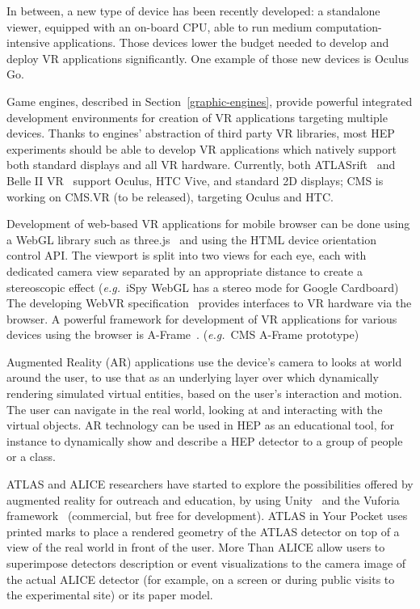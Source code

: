 \documentclass[12pt,a4paper]{article}
\begin{document}
In between, a new type of device has been recently developed: a standalone viewer, equipped with an on-board CPU, able to run medium computation-intensive applications. Those devices lower the budget needed to develop and deploy VR applications significantly. One example of those new devices is Oculus Go\cite{OculusGo}. 

Game engines, described in Section~\ref{graphic-engines},  provide powerful integrated development environments for creation of VR applications targeting multiple devices. Thanks to engines' abstraction of third party VR libraries, most HEP experiments should be able to develop VR applications which natively support both standard displays and all VR hardware. Currently, both ATLASrift~\cite{ATLASRift} and Belle II VR~\cite{BelleIIVR} support Oculus, HTC Vive,
and standard 2D displays; CMS is working on CMS.VR (to be released), targeting Oculus and HTC. 

Development of web-based VR applications for mobile browser can be done using a WebGL library such as three.js~\cite{ThreeJS} and using the
HTML device orientation control API. The viewport is split into two views for each eye, each with dedicated camera view separated
by an appropriate distance to create a stereoscopic effect ({\it e.g.}\ iSpy WebGL has a stereo mode for Google Cardboard)
The developing WebVR specification~\cite{WebVR} provides interfaces to VR hardware via the browser. A powerful framework for
development of VR applications for various devices using the browser is A-Frame~\cite{AFrame}. ({\it e.g.}\ CMS A-Frame prototype)


Augmented Reality (AR) applications use the device's camera to looks at world around the user, to use that as an underlying layer over which dynamically rendering simulated virtual entities, based on the user's interaction and motion. The user can navigate in the real world, looking at and interacting with the virtual objects. AR technology can be used in HEP as an educational tool, for instance to dynamically show and describe a HEP detector to a group of people or a class. 

ATLAS and ALICE researchers have started to explore the possibilities offered by augmented reality for outreach and education, by using Unity~\cite{Unity3D} and the Vuforia framework~\cite{VuforiaAR} (commercial, but free for development). ATLAS in Your Pocket uses printed marks to place a rendered geometry of the ATLAS detector on top of a view of the real world in front of the user. More Than ALICE allow users to superimpose detectors description or event visualizations to the camera image of the actual ALICE detector (for example, on a screen or during public visits to the experimental site) or its paper model.
\end{document}
